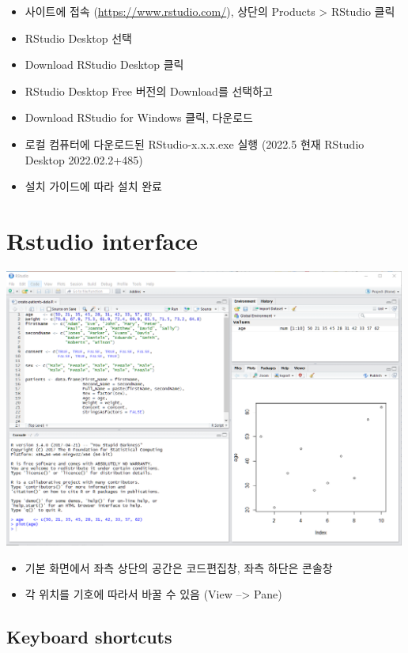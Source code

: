 \documentclass[
]{book}
\providecommand{\tightlist}{%
  \setlength{\itemsep}{0pt}\setlength{\parskip}{0pt}}
\begin{document}
\begin{itemize}
\tightlist
\item
  사이트에 접속 (\url{https://www.rstudio.com/}), 상단의 Products \textgreater{} RStudio 클릭
\item
  RStudio Desktop 선택
\item
  Download RStudio Desktop 클릭
\item
  RStudio Desktop Free 버전의 Download를 선택하고
\item
  Download RStudio for Windows 클릭, 다운로드
\item
  로컬 컴퓨터에 다운로드된 RStudio-x.x.x.exe 실행 (2022.5 현재 RStudio Desktop 2022.02.2+485)
\item
  설치 가이드에 따라 설치 완료
\end{itemize}

\hypertarget{rstudio-interface}{%
\section{Rstudio interface}\label{rstudio-interface}}

\includegraphics[width=5.20833in,height=\textheight]{images/01/01-11.PNG}

\begin{itemize}
\tightlist
\item
  기본 화면에서 좌측 상단의 공간은 코드편집창, 좌측 하단은 콘솔창
\item
  각 위치를 기호에 따라서 바꿀 수 있음 (View --\textgreater{} Pane)
\end{itemize}

\hypertarget{keyboard-shortcuts}{%
\subsection{Keyboard shortcuts}\label{keyboard-shortcuts}}
\end{document}
